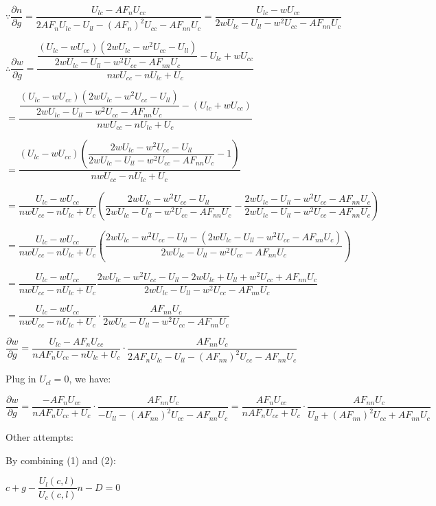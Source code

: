 \documentclass{article}
\begin{document}
$\because \dfrac{\partial n}{\partial g}=\dfrac{U_{lc}-AF_{n}U_{cc}}{2AF_{n}U_{lc}-U_{ll}-\left(AF_{n}\right)^2U_{cc}-AF_{nn}U_{c}}=\dfrac{U_{lc}-wU_{cc}}{2wU_{lc}-U_{ll}-w^{2}U_{cc}-AF_{nn}U_{c}}$

$\therefore \dfrac{\partial w}{\partial g}=\dfrac{\dfrac{\left(U_{lc}-wU_{cc}\right)\left(2wU_{lc}-w^2U_{cc}-U_{ll}\right)}{2wU_{lc}-U_{ll}-w^{2}U_{cc}-AF_{nn}U_{c}}-U_{lc}+wU_{cc}}{nwU_{cc}-nU_{lc}+U_{c}}$

$=\dfrac{\dfrac{\left(U_{lc}-wU_{cc}\right)\left(2wU_{lc}-w^2U_{cc}-U_{ll}\right)}{2wU_{lc}-U_{ll}-w^{2}U_{cc}-AF_{nn}U_{c}}-\left(U_{lc}+wU_{cc}\right)}{nwU_{cc}-nU_{lc}+U_{c}}$

$=\dfrac{\left(U_{lc}-wU_{cc}\right)\left(\dfrac{2wU_{lc}-w^2U_{cc}-U_{ll}}{2wU_{lc}-U_{ll}-w^{2}U_{cc}-AF_{nn}U_{c}}-1\right)}{nwU_{cc}-nU_{lc}+U_{c}}$

$=\dfrac{U_{lc}-wU_{cc}}{nwU_{cc}-nU_{lc}+U_{c}}\left(\dfrac{2wU_{lc}-w^2U_{cc}-U_{ll}}{2wU_{lc}-U_{ll}-w^{2}U_{cc}-AF_{nn}U_{c}}-\dfrac{2wU_{lc}-U_{ll}-w^{2}U_{cc}-AF_{nn}U_{c}}{2wU_{lc}-U_{ll}-w^{2}U_{cc}-AF_{nn}U_{c}}\right)$

$=\dfrac{U_{lc}-wU_{cc}}{nwU_{cc}-nU_{lc}+U_{c}}\left(\dfrac{2wU_{lc}-w^2U_{cc}-U_{ll}-\left(2wU_{lc}-U_{ll}-w^{2}U_{cc}-AF_{nn}U_{c}\right)}{2wU_{lc}-U_{ll}-w^{2}U_{cc}-AF_{nn}U_{c}}\right)$

$=\dfrac{U_{lc}-wU_{cc}}{nwU_{cc}-nU_{lc}+U_{c}}\dfrac{2wU_{lc}-w^2U_{cc}-U_{ll}-2wU_{lc}+U_{ll}+w^{2}U_{cc}+AF_{nn}U_{c}}{2wU_{lc}-U_{ll}-w^{2}U_{cc}-AF_{nn}U_{c}}$

$=\dfrac{U_{lc}-wU_{cc}}{nwU_{cc}-nU_{lc}+U_{c}}\cdot\dfrac{AF_{nn}U_{c}}{2wU_{lc}-U_{ll}-w^{2}U_{cc}-AF_{nn}U_{c}}$

$\boxed{\dfrac{\partial w}{\partial g}=\dfrac{U_{lc}-AF_{n}U_{cc}}{nAF_{n}U_{cc}-nU_{lc}+U_{c}}\cdot\dfrac{AF_{nn}U_{c}}{2AF_{n}U_{lc}-U_{ll}-\left(AF_{nn}\right)^{2}U_{cc}-AF_{nn}U_{c}}}$

Plug in $U_{cl}=0$, we have:

$\dfrac{\partial w}{\partial g}=\dfrac{-AF_{n}U_{cc}}{nAF_{n}U_{cc}+U_{c}}\cdot\dfrac{AF_{nn}U_{c}}{-U_{ll}-\left(AF_{nn}\right)^{2}U_{cc}-AF_{nn}U_{c}}=\boxed{\dfrac{AF_{n}U_{cc}}{nAF_{n}U_{cc}+U_{c}}\cdot\dfrac{AF_{nn}U_{c}}{U_{ll}+\left(AF_{nn}\right)^{2}U_{cc}+AF_{nn}U_{c}}}$

Other attempts:

By combining (1) and (2):

$c+g-\dfrac{U_{l}\left(c,l\right)}{U_{c}\left(c,l\right)}n-D=0$
\end{document}
